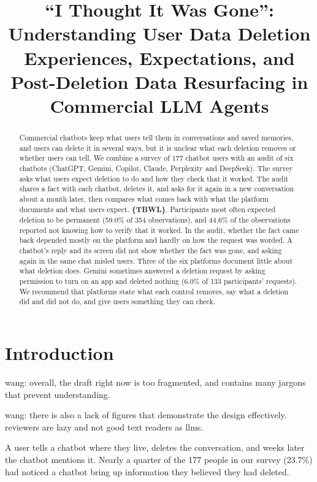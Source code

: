 \documentclass[conference,compsoc]{IEEEtran}
\title{``I Thought It Was Gone'': Understanding User Data Deletion Experiences, Expectations, and Post-Deletion Data Resurfacing in Commercial LLM Agents}
\author{\IEEEauthorblockN{Anonymous Author(s)}
\IEEEauthorblockA{Submission \#XXX}}
\newcommand{\xw}[1] {{\color{red}wang: #1}}
\begin{document}
\maketitle

\begin{abstract}
Commercial chatbots keep what users tell them in conversations and saved memories, and users can delete it in several ways, but it is unclear what each deletion removes or whether users can tell. We combine a survey of 177 chatbot users with an audit of six chatbots (ChatGPT, Gemini, Copilot, Claude, Perplexity and DeepSeek). The survey asks what users expect deletion to do and how they check that it worked. The audit shares a fact with each chatbot, deletes it, and asks for it again in a new conversation about a month later, then compares what comes back with what the platform documents and what users expect. \textbf{\{TBWL\}}. Participants most often expected deletion to be permanent (59.0\% of 354 observations), and 44.6\% of the observations reported not knowing how to verify that it worked. In the audit, whether the fact came back depended mostly on the platform and hardly on how the request was worded. A chatbot's reply and its screen did not show whether the fact was gone, and asking again in the same chat misled users. Three of the six platforms document little about what deletion does. Gemini sometimes answered a deletion request by asking permission to turn on an app and deleted nothing (6.0\% of 133 participants' requests). We recommend that platforms state what each control removes, say what a deletion did and did not do, and give users something they can check.
\end{abstract}

\section{Introduction}
\label{sec:intro}

\xw{overall, the draft right now is too fragmented, and contains many jargons that prevent understanding.}

\xw{there is also a lack of figures that demonstrate the design effectively. reviewers are lazy and not good text readers as llms.}

A user tells a chatbot where they live, deletes the conversation, and weeks later the chatbot mentions it.
Nearly a quarter of the 177 people in our survey (23.7\%) had noticed a chatbot bring up information they believed they had deleted.
\end{document}
